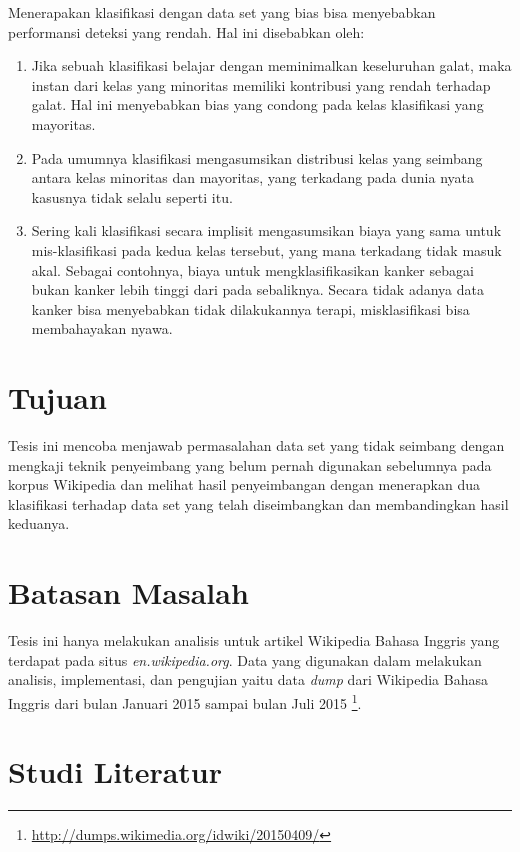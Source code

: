 \documentclass[12pt,a4paper,titlepage]{article}
\begin{document}
Menerapakan klasifikasi dengan data set yang bias bisa menyebabkan performansi
deteksi yang rendah.  Hal ini disebabkan oleh:
\begin{enumerate}
	\item Jika sebuah klasifikasi belajar dengan meminimalkan keseluruhan
galat, maka instan dari kelas yang minoritas memiliki kontribusi yang rendah
terhadap galat. Hal ini menyebabkan bias yang condong pada kelas klasifikasi
yang mayoritas.
	\item Pada umumnya klasifikasi mengasumsikan distribusi kelas yang
seimbang antara kelas minoritas dan mayoritas, yang terkadang pada dunia nyata
kasusnya tidak selalu seperti itu.
	\item Sering kali klasifikasi secara implisit mengasumsikan biaya yang
sama untuk mis-klasifikasi pada kedua kelas tersebut, yang mana terkadang tidak
masuk akal. Sebagai contohnya, biaya untuk mengklasifikasikan kanker sebagai
bukan kanker lebih tinggi dari pada sebaliknya. Secara tidak adanya data kanker
bisa menyebabkan tidak dilakukannya terapi, misklasifikasi bisa membahayakan
nyawa.
\end{enumerate}

\section{Tujuan}\label{sec:tujuan}

Tesis ini mencoba menjawab permasalahan data set yang tidak seimbang
dengan mengkaji teknik penyeimbang yang belum pernah digunakan sebelumnya pada
korpus Wikipedia dan melihat hasil penyeimbangan dengan menerapkan dua
klasifikasi terhadap data set yang telah diseimbangkan dan membandingkan
hasil keduanya.

\section{Batasan Masalah}\label{sec:batasan-masalah}

Tesis ini hanya melakukan analisis untuk artikel Wikipedia Bahasa Inggris
yang terdapat pada situs \textit{en.wikipedia.org}. Data yang digunakan dalam
melakukan analisis, implementasi, dan pengujian yaitu data \textit{dump} dari
Wikipedia Bahasa Inggris dari bulan Januari 2015 sampai bulan Juli 2015
\footnote{\url{http://dumps.wikimedia.org/idwiki/20150409/}}.

\section{Studi Literatur}\label{sec:studi-literatur}
\end{document}
